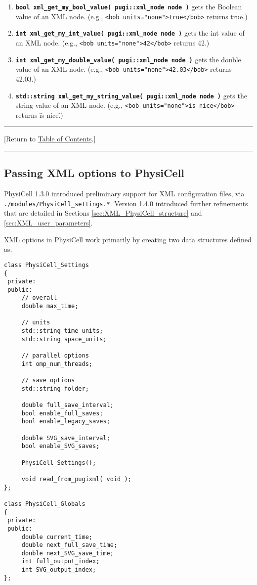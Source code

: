 \documentclass[12pt]{article}
\renewcommand{\v}{\verb}
\newcommand{\smallcode}[1]{\textbf{\texttt{#1}}}
\newcommand{\TOClink}{\begin{center}\hrule\vskip-10pt\phantom{.}\hfill[Return to \hyperlink{TOC}{Table of Contents}.]\hfill\phantom{.}\vskip3pt\hrule\end{center}}
\begin{document}
\begin{enumerate}
\item 
\smallcode{bool xml\_get\_my\_bool\_value( pugi::xml\_node node )} gets the Boolean value of an XML node. (e.g., \v|<bob units="none">true</bob>| returns true.) 


\item 
\smallcode{int xml\_get\_my\_int\_value( pugi::xml\_node node )} gets the int value of an XML node. (e.g., \v|<bob units="none">42</bob>| returns 42.) 
 

\item 
\smallcode{int xml\_get\_my\_double\_value( pugi::xml\_node node )} gets the double value of an XML node. (e.g., \v|<bob units="none">42.03</bob>| returns 42.03.) 
 

\item 
\smallcode{std::string xml\_get\_my\_string\_value( pugi::xml\_node node )} gets the string value of an XML node. (e.g., \v|<bob units="none">is nice</bob>| returns \"is nice\".) 




\end{enumerate}
\TOClink

\subsection{Passing XML options to PhysiCell}
\label{sec:XML_options}
PhysiCell 1.3.0 introduced preliminary support for XML configuration files, via \hfill\break
\v|./modules/PhysiCell_settings.*|. Version 1.4.0 introduced further refinements that are 
detailed in Sections \ref{sec:XML_PhysiCell_structure} and \ref{sec:XML_user_parameters}.

XML options in PhysiCell work  primarily  by creating two data 
structures defined as: 

\begin{verbatim}
class PhysiCell_Settings
{
 private:
 public:
     // overall 
     double max_time;   

     // units
     std::string time_units; 
     std::string space_units; 
 
     // parallel options 
     int omp_num_threads; 
     
     // save options
     std::string folder; 

     double full_save_interval;  
     bool enable_full_saves; 
     bool enable_legacy_saves; 
     
     double SVG_save_interval; 
     bool enable_SVG_saves; 
     
     PhysiCell_Settings();
     
     void read_from_pugixml( void ); 
};

class PhysiCell_Globals
{
 private:
 public:
     double current_time; 
     double next_full_save_time; 
     double next_SVG_save_time; 
     int full_output_index; 
     int SVG_output_index; 
};
\end{verbatim}
\end{document}

